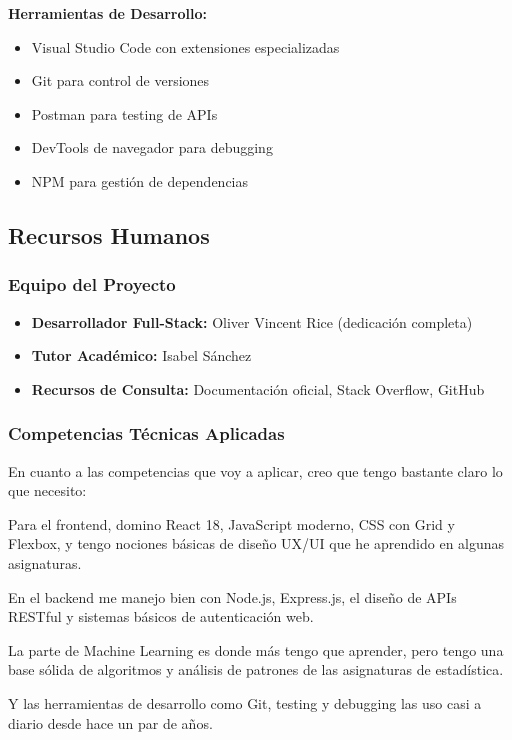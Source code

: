 \documentclass[12pt,a4paper,spanish]{article}
\begin{document}
\textbf{Herramientas de Desarrollo:}
\begin{itemize}
    \item Visual Studio Code con extensiones especializadas
    \item Git para control de versiones
    \item Postman para testing de APIs
    \item DevTools de navegador para debugging
    \item NPM para gestión de dependencias
\end{itemize}

\subsection{Recursos Humanos}

\subsubsection{Equipo del Proyecto}
\begin{itemize}
    \item \textbf{Desarrollador Full-Stack:} Oliver Vincent Rice (dedicación completa)
    \item \textbf{Tutor Académico:} Isabel Sánchez
    \item \textbf{Recursos de Consulta:} Documentación oficial, Stack Overflow, GitHub
\end{itemize}

\subsubsection{Competencias Técnicas Aplicadas}
En cuanto a las competencias que voy a aplicar, creo que tengo bastante claro lo que necesito:

Para el frontend, domino React 18, JavaScript moderno, CSS con Grid y Flexbox, y tengo nociones básicas de diseño UX/UI que he aprendido en algunas asignaturas.

En el backend me manejo bien con Node.js, Express.js, el diseño de APIs RESTful y sistemas básicos de autenticación web.

La parte de Machine Learning es donde más tengo que aprender, pero tengo una base sólida de algoritmos y análisis de patrones de las asignaturas de estadística.

Y las herramientas de desarrollo como Git, testing y debugging las uso casi a diario desde hace un par de años.
\end{document}
